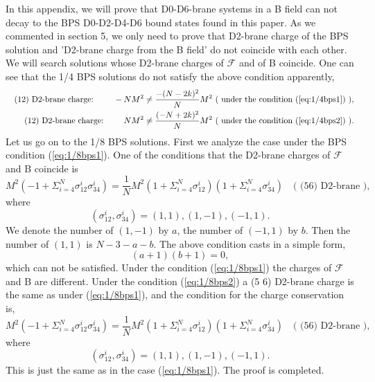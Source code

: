 \documentclass[a4paper,12pt]{article}
\begin{document}
In this appendix, we will prove that D0-D6-brane systems in a B field can not decay to the BPS D0-D2-D4-D6 bound states found in this paper. As we commented in section 5, we only need to prove that D2-brane charge of the BPS solution and 'D2-brane charge from the B field' do not coincide with each other. We will search solutions whose D2-brane charges of $\mathcal{F}$ and of B coincide. One can see that the 1/4 BPS solutions do not satisfy the above condition apparently,
\begin{eqnarray}
&& \mbox{(12) D2-brane charge: } \qquad   -NM^2 \neq \frac{-(N-2k)^2}{N}M^2   \mbox{ ( under the condition (\ref{eq:1/4bps1}) )}, \nonumber \\
&& \mbox{(12) D2-brane charge: } \qquad  NM^2 \neq \frac{(-N+2k)^2}{N}M^2   \mbox{ ( under the condition (\ref{eq:1/4bps2}) )}. \nonumber
\end{eqnarray}
Let us go on to the 1/8 BPS solutions. First we analyze the case under the BPS condition (\ref{eq:1/8bps1}). One of the conditions that the D2-brane charges of $\mathcal{F}$ and  B coincide is
\[M^2(-1+\Sigma_{i=4}^N\sigma_{12}^i\sigma_{34}^i) = \frac{1}{N}M^2(1+\Sigma_{i=4}^N\sigma_{12}^i)(1+\Sigma_{i=4}^N\sigma_{34}^i) \quad  \mbox{( (56) D2-brane )} , \]
 where  
\[ (\sigma_{12}^i, \sigma_{34}^i) = (1,1), (1,-1), (-1,1). \]
We denote the number of $(1,-1)$ by $a$, the number of $(-1,1)$ by $b$. Then the number of $(1,1)$ is $N-3-a-b$. The above condition casts in a simple form,
\[ (a+1)(b+1)=0, \]
which can not be satisfied. Under the condition (\ref{eq:1/8bps1}) the charges of $\mathcal{F}$ and B are different. Under the condition (\ref{eq:1/8bps2}) a (5 6) D2-brane charge is the same as under (\ref{eq:1/8bps1}), and the condition for the charge conservation is,
\[M^2(-1+\Sigma_{i=4}^N\sigma_{12}^i\sigma_{34}^i) = \frac{1}{N}M^2(1+\Sigma_{i=4}^N\sigma_{12}^i)(1+\Sigma_{i=4}^N\sigma_{34}^i) \quad \mbox{( (56) D2-brane )} ,\]
 where  
\[ (\sigma_{12}^i, \sigma_{34}^i) = (1,1), (1,-1), (-1,1). \]
This is just the same as in the case (\ref{eq:1/8bps1}). The proof is completed.

\newpage
\end{document}
